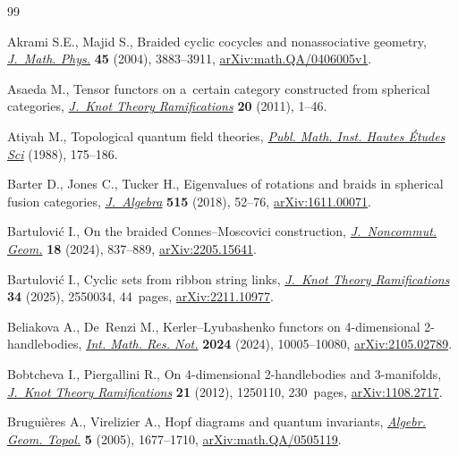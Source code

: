 \documentclass[pdftex]{sigma}
\numberwithin{equation}{section}
\begin{document}
\begin{thebibliography}{99}
\footnotesize\itemsep=0pt

Akrami S.E., Majid S., Braided cyclic cocycles and nonassociative geometry,
 \href{https://doi.org/10.1063/1.1787621}{\textit{J.~Math. Phys.}} \textbf{45}
 (2004), 3883--3911,
 \href{http://arxiv.org/abs/math.QA/0406005v1}{arXiv:math.QA/0406005v1}.

Asaeda M., Tensor functors on a~certain category constructed from spherical
 categories, \href{https://doi.org/10.1142/S0218216511008607}{\textit{J.~Knot
 Theory Ramifications}} \textbf{20} (2011), 1--46.

Atiyah M., Topological quantum field theories,
 \href{https://doi.org/10.1007/BF02698547}{\textit{Publ. Math. Inst. Hautes
 \'Etudes Sci}} (1988), 175--186.

Barter D., Jones C., Tucker H., Eigenvalues of rotations and braids in
 spherical fusion categories,
 \href{https://doi.org/10.1016/j.jalgebra.2018.08.011}{\textit{J.~Algebra}}
 \textbf{515} (2018), 52--76,
 \href{http://arxiv.org/abs/1611.00071}{arXiv:1611.00071}.

Bartulovi\'c I., On the braided {C}onnes--{M}oscovici construction,
 \href{https://doi.org/10.4171/jncg/541}{\textit{J.~Noncommut. Geom.}}
 \textbf{18} (2024), 837--889,
 \href{http://arxiv.org/abs/2205.15641}{arXiv:2205.15641}.

Bartulovi\'c I., Cyclic sets from ribbon string links,
 \href{https://doi.org/10.1142/S0218216525500348}{\textit{J.~Knot Theory
 Ramifications}} \textbf{34} (2025), 2550034, 44~pages,
 \href{http://arxiv.org/abs/2211.10977}{arXiv:2211.10977}.

Beliakova A., De~Renzi M., Kerler--{L}yubashenko functors on 4-dimensional
 2-handlebodies, \href{https://doi.org/10.1093/imrn/rnac039}{\textit{Int.
 Math. Res. Not.}} \textbf{2024} (2024), 10005--10080,
 \href{http://arxiv.org/abs/2105.02789}{arXiv:2105.02789}.

Bobtcheva I., Piergallini R., On 4-dimensional 2-handlebodies and 3-manifolds,
 \href{https://doi.org/10.1142/S0218216512501106}{\textit{J.~Knot Theory
 Ramifications}} \textbf{21} (2012), 1250110, 230~pages,
 \href{http://arxiv.org/abs/1108.2717}{arXiv:1108.2717}.

Brugui\`eres A., Virelizier A., Hopf diagrams and quantum invariants,
 \href{https://doi.org/10.2140/agt.2005.5.1677}{\textit{Algebr. Geom. Topol.}}
 \textbf{5} (2005), 1677--1710,
 \href{http://arxiv.org/abs/math.QA/0505119}{arXiv:math.QA/0505119}.


\end{thebibliography}
\end{document}
